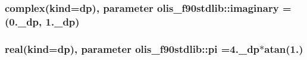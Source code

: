 \subsubsection[{\texorpdfstring{imaginary}{imaginary}}]{\setlength{\rightskip}{0pt plus 5cm}complex(kind=dp), parameter olis\+\_\+f90stdlib\+::imaginary =(0.\+\_\+dp, 1.\+\_\+dp)}\hypertarget{namespaceolis__f90stdlib_a0a22d30625256a14acc49cd749e88cb7}{}\label{namespaceolis__f90stdlib_a0a22d30625256a14acc49cd749e88cb7}
\subsubsection[{\texorpdfstring{pi}{pi}}]{\setlength{\rightskip}{0pt plus 5cm}real(kind=dp), parameter olis\+\_\+f90stdlib\+::pi =4.\+\_\+dp$\ast$atan(1.)}\hypertarget{namespaceolis__f90stdlib_a106e09303fbf05972f0635ff67f73c9d}{}\label{namespaceolis__f90stdlib_a106e09303fbf05972f0635ff67f73c9d}
